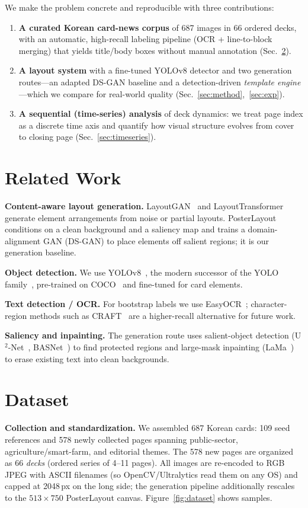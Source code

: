 \documentclass[10pt,twocolumn,letterpaper]{article}
\begin{document}
We make the problem concrete and reproducible with three contributions:
\begin{enumerate}\itemsep1pt
  \item \textbf{A curated Korean card-news corpus} of 687 images in 66 ordered
  decks, with an automatic, high-recall labeling pipeline (OCR + line-to-block
  merging) that yields title/body boxes without manual annotation
  (Sec.~\ref{sec:data}).
  \item \textbf{A layout system} with a fine-tuned YOLOv8 detector and two
  generation routes---an adapted DS-GAN baseline and a detection-driven
  \emph{template engine}---which we compare for real-world quality
  (Sec.~\ref{sec:method},~\ref{sec:exp}).
  \item \textbf{A sequential (time-series) analysis} of deck dynamics: we treat
  page index as a discrete time axis and quantify how visual structure evolves
  from cover to closing page (Sec.~\ref{sec:timeseries}).
\end{enumerate}

\section{Related Work}
\textbf{Content-aware layout generation.} LayoutGAN~\cite{layoutgan2019} and
LayoutTransformer~\cite{layouttransformer2021} generate element arrangements from
noise or partial layouts. PosterLayout~\cite{posterlayout2023} conditions on a
clean background and a saliency map and trains a domain-alignment GAN (DS-GAN) to
place elements off salient regions; it is our generation baseline.

\textbf{Object detection.} We use YOLOv8~\cite{yolov8}, the modern successor of
the YOLO family~\cite{redmon2016yolo}, pre-trained on COCO~\cite{lin2014coco} and
fine-tuned for card elements.

\textbf{Text detection / OCR.} For bootstrap labels we use
EasyOCR~\cite{easyocr}; character-region methods such as CRAFT~\cite{craft2019}
are a higher-recall alternative for future work.

\textbf{Saliency and inpainting.} The generation route uses salient-object
detection (U$^2$-Net~\cite{u2net2020}, BASNet~\cite{basnet2019}) to find
protected regions and large-mask inpainting (LaMa~\cite{lama2022}) to erase
existing text into clean backgrounds.

\section{Dataset}
\label{sec:data}
\textbf{Collection and standardization.} We assembled 687 Korean cards: 109
seed references and 578 newly collected pages spanning public-sector,
agriculture/smart-farm, and editorial themes. The 578 new pages are organized as
66 \emph{decks} (ordered series of 4--11 pages). All images are re-encoded to RGB
JPEG with ASCII filenames (so OpenCV/Ultralytics read them on any OS) and capped
at 2048\,px on the long side; the generation pipeline additionally rescales to
the $513\times750$ PosterLayout canvas. Figure~\ref{fig:dataset} shows samples.
\end{document}

